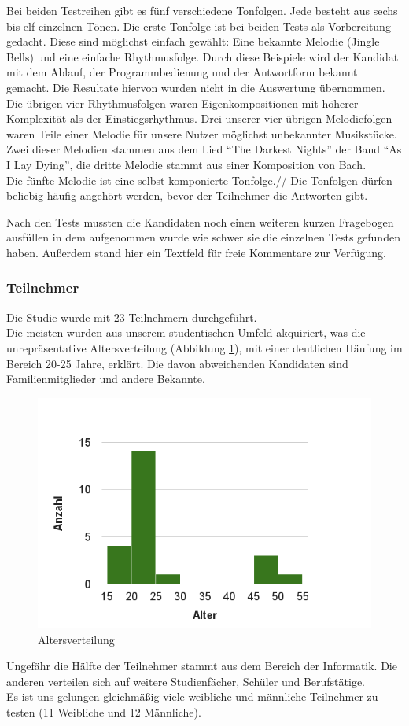 \documentclass{acm_proc_article-sp}
\begin{document}
Bei beiden Testreihen gibt es fünf verschiedene Tonfolgen. Jede besteht aus sechs bis elf einzelnen Tönen. Die erste Tonfolge ist bei beiden Tests als Vorbereitung gedacht. Diese sind möglichst einfach gewählt: Eine bekannte Melodie (Jingle Bells) und eine einfache Rhythmusfolge. Durch diese Beispiele wird der Kandidat mit dem Ablauf, der Programmbedienung und der Antwortform bekannt gemacht. Die Resultate hiervon wurden nicht in die Auswertung übernommen. \\
Die übrigen vier Rhythmusfolgen waren Eigenkompositionen mit höherer Komplexität als der Einstiegsrhythmus.
Drei unserer vier übrigen Melodiefolgen waren Teile einer Melodie für unsere Nutzer möglichst unbekannter Musikstücke.
Zwei dieser Melodien stammen aus dem Lied "`The Darkest Nights"' der Band "`As I Lay Dying"', die dritte Melodie stammt aus einer Komposition von Bach.\\
Die fünfte Melodie ist eine selbst komponierte Tonfolge.//
Die Tonfolgen dürfen beliebig häufig angehört werden, bevor der Teilnehmer die Antworten gibt.
 
Nach den Tests mussten die Kandidaten noch einen weiteren kurzen Fragebogen ausfüllen in dem aufgenommen wurde wie schwer sie die einzelnen Tests gefunden haben. Außerdem stand hier ein Textfeld für freie Kommentare zur Verfügung. 

\subsubsection{Teilnehmer}
Die Studie wurde mit 23 Teilnehmern durchgeführt.\\
Die meisten wurden aus unserem studentischen Umfeld akquiriert, was die unrepräsentative Altersverteilung (Abbildung \ref{Alter}), mit einer deutlichen Häufung im Bereich 20-25 Jahre, erklärt. Die davon abweichenden Kandidaten sind Familienmitglieder und andere Bekannte.
\begin{figure}[h]
\includegraphics[width=1.0\linewidth]{Abbildungen/Altersverteilung.png}
\caption{Altersverteilung}
\label{Alter}
\end{figure}
Ungefähr die Hälfte der Teilnehmer stammt aus dem Bereich der Informatik. Die anderen verteilen sich auf weitere Studienfächer, Schüler und Berufstätige.\\
Es ist uns gelungen gleichmäßig viele weibliche und männliche Teilnehmer zu testen (11 Weibliche und 12 Männliche). 
\end{document}

